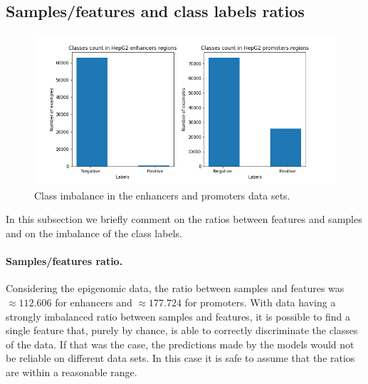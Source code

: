 \documentclass{article}
\begin{document}
\subsection{Samples/features and class labels ratios}
\label{subsec:exp:ratios}

\begin{figure}
    \centering
    \includegraphics[width=\textwidth]{img/classes_count.png}
    \caption{Class imbalance in the enhancers and promoters data sets.}
    \label{fig:exp:class_imbalance}
\end{figure}

In this subsection we briefly comment on the ratios between features and samples and on the imbalance of the class labels.

\paragraph{Samples/features ratio.} Considering the epigenomic data, the ratio between samples and features was $\approx 112.606$ for enhancers and $\approx 177.724$ for promoters. With data having a strongly imbalanced ratio between samples and features, it is possible to find a single feature that, purely by chance, is able to correctly discriminate the classes of the data. If that was the case, the predictions made by the models would not be reliable on different data sets. In this case it is safe to assume that the ratios are within a reasonable range.
\end{document}
